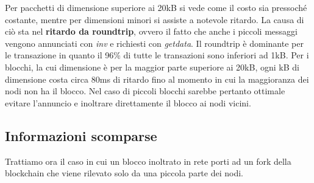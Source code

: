 Per pacchetti di dimensione superiore ai 20kB si vede come il costo sia pressoché costante, mentre per dimensioni minori si assiste a notevole ritardo. La causa di ciò sta nel \textbf{ritardo da roundtrip}, ovvero il fatto che anche i piccoli messaggi vengono annunciati con \emph{inv} e richiesti con \emph{getdata}. Il roundtrip è dominante per le transazione in quanto il 96\% di tutte le transazioni sono inferiori ad 1kB. Per i blocchi, la cui dimensione è per la maggior parte superiore ai 20kB, ogni kB di dimensione costa circa 80ms di ritardo fino al momento in cui la maggioranza dei nodi non ha il blocco. %
Nel caso di piccoli blocchi sarebbe pertanto ottimale evitare l'annuncio e inoltrare direttamente il blocco ai nodi vicini.

\subsection{Informazioni scomparse}\label{informazioni-scomparse}

Trattiamo ora il caso in cui un blocco inoltrato in rete porti ad un fork della blockchain che viene rilevato solo da una piccola parte dei nodi.

